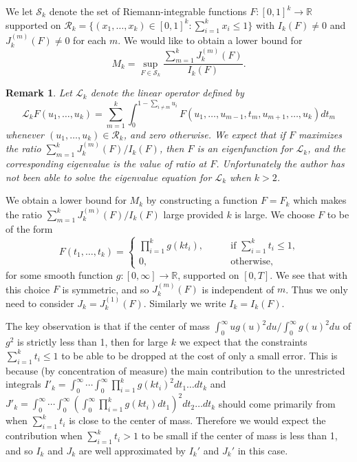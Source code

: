 \documentclass[12pt,a4paper]{amsart}
\theoremstyle{plain}
\newtheorem*{rmk}{Remark}
\numberwithin{sblmm}{thrm}
\numberwithin{equation}{section}
\begin{document}
We let $\mathcal{S}_k$ denote the set of Riemann-integrable functions $F:[0,1]^k\rightarrow\mathbb{R}$ supported on $\mathcal{R}_k=\{(x_1,\dotsc,x_k)\in[0,1]^k:\sum_{i=1}^kx_i\le 1\}$ with $I_k(F)\ne 0$ and $J_k^{(m)}(F)\ne 0$ for each $m$. We would like to obtain a lower bound for
\begin{equation}
M_k=\sup_{F\in\mathcal{S}_k}\frac{\sum_{m=1}^k J_k^{(m)}(F)}{I_k(F)}.
\end{equation}
\begin{rmk}
Let $\mathcal{L}_k$ denote the linear operator defined by
\begin{equation}
\mathcal{L}_kF(u_1,\dotsc,u_k)=\sum_{m=1}^k\int_0^{1-\sum_{i\ne m}u_i}F(u_1,\dotsc,u_{m-1},t_m,u_{m+1},\dotsc,u_k)dt_m
\end{equation}
whenever $(u_1,\dotsc,u_k)\in\mathcal{R}_k$, and zero otherwise. We expect that if $F$ maximizes the ratio $\sum_{m=1}^kJ_k^{(m)}(F)/I_k(F)$, then $F$ is an eigenfunction for $\mathcal{L}_k$, and the corresponding eigenvalue is the value of ratio at $F$. Unfortunately the author has not been able to solve the eigenvalue equation for $\mathcal{L}_k$ when $k>2$.
\end{rmk}
We obtain a lower bound for $M_k$ by constructing a function $F=F_k$ which makes the ratio $\sum_{m=1}^kJ_k^{(m)}(F)/I_k(F)$ large provided $k$ is large. We choose $F$ to be of the form
\begin{equation}\label{eq:FChoiceKLarge}
F(t_1,\dots,t_k)=\begin{cases}
\prod_{i=1}^k g(kt_i),\qquad &\text{if $\sum_{i=1}^kt_i\le 1$,}\\
0,&\text{otherwise,}\end{cases}
\end{equation}
for some smooth function $g:[0,\infty]\rightarrow\mathbb{R}$, supported on $[0,T]$. We see that with this choice $F$ is symmetric, and so $J^{(m)}_k(F)$ is independent of $m$. Thus we only need to consider $J_k=J_k^{(1)}(F)$. Similarly we write $I_k=I_k(F)$.

The key observation is that if the center of mass $\int_0^\infty u g(u)^2du/\int_0^\infty g(u)^2du$ of $g^2$ is strictly less than 1, then for large $k$ we expect that the constraints $\sum_{i=1}^kt_i\le 1$ to be able to be dropped at the cost of only a small error. This is because (by concentration of measure) the main contribution to the unrestricted integrals $I'_k=\int_0^\infty\dotsi\int_0^\infty \prod_{i=1}^kg(kt_i)^2 dt_1\dotsc dt_k$ and $J'_k=\int_0^\infty\dotsi\int_0^\infty(\int_0^\infty \prod_{i=1}^kg(kt_i) dt_1)^2dt_2\dotsc dt_k$ should come primarily from when $\sum_{i=1}^kt_i$ is close to the center of mass. Therefore  we would expect the contribution when $\sum_{i=1}^k t_i>1$ to be small if the center of mass is less than 1, and so $I_k$ and $J_k$ are well approximated by $I_k'$ and $J_k'$ in this case.
\end{document}
